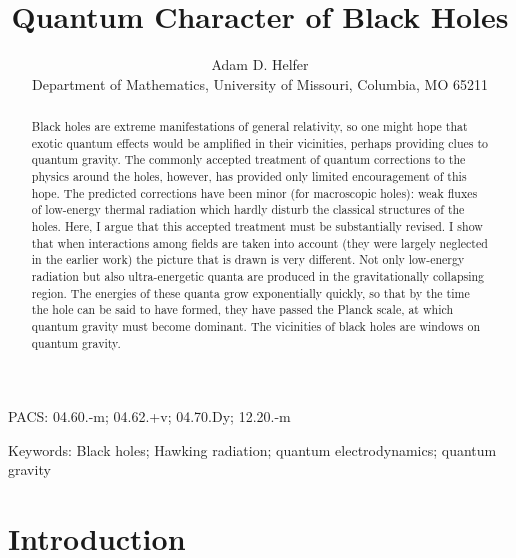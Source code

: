\documentclass[11pt]{article}
\date{\empty}
\begin{document}
\title{Quantum Character of Black Holes}

\author{Adam D. Helfer\\ %
{\small Department of Mathematics, University of Missouri,
Columbia, MO 65211}}
\maketitle

\begin{abstract}  
Black holes are extreme manifestations of general relativity, so one might hope
that exotic quantum effects would be amplified in their vicinities, perhaps
providing clues to quantum gravity.  The commonly accepted treatment of 
quantum corrections to the physics around the holes, however, has provided only
limited encouragement of this hope. The predicted corrections have been minor
(for macroscopic holes):  weak fluxes of low-energy thermal radiation which
hardly disturb the classical structures of the holes. Here, I argue that this
accepted treatment must be substantially revised.  I show that when
interactions among fields are taken into account (they were 
largely neglected in the
earlier work) the picture that is drawn is very different.  Not only low-energy
radiation but also ultra-energetic quanta are produced in the gravitationally
collapsing region.  The energies of these quanta grow exponentially quickly, so
that by the time the hole can be said to have formed, they have passed the
Planck scale, at which quantum gravity must become dominant.  The vicinities of
black holes are windows on quantum gravity.

\end{abstract}             

\begin{center}
PACS:  04.60.-m; %
04.62.+v; %
04.70.Dy; %
12.20.-m %
\end{center}

\begin{center}
Keywords:  
Black holes; Hawking radiation; quantum electrodynamics;
quantum gravity
\end{center}                                                    



\section{Introduction}
\label{sec:intro}
\end{document}
